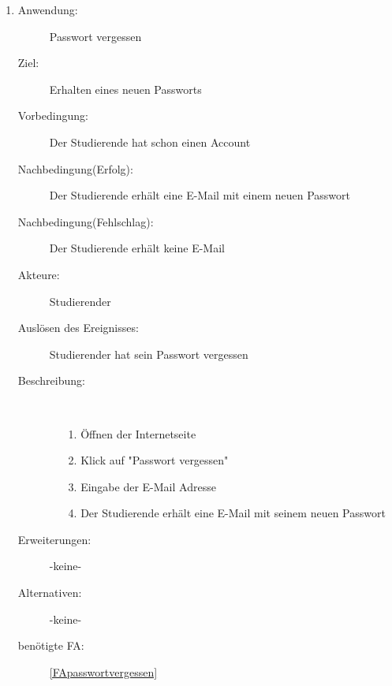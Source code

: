 \documentclass[parskip=full]{scrartcl}
\newcommand{\swtLabel}[1]{\textbf{/#1\arabic*0/}}
\begin{document}
\begin{enumerate}[label=\swtLabel{S}]
  
  \item
    \begin{description}
  	\item[Anwendung:] Passwort vergessen
  	\item[Ziel:] Erhalten eines neuen Passworts
  	\item[Vorbedingung:] Der Studierende hat schon einen Account
  	\item[Nachbedingung(Erfolg):] Der Studierende erhält eine E-Mail mit einem
  	neuen Passwort
  	\item[Nachbedingung(Fehlschlag):] Der Studierende erhält keine E-Mail
  	\item[Akteure:] Studierender
  	\item[Auslösen des Ereignisses:] Studierender hat sein Passwort vergessen
  	\item[Beschreibung:]~
  	\begin{enumerate}
  	  \item[1.] Öffnen der Internetseite
      \item[2.] Klick auf "Passwort vergessen"
      \item[3.] Eingabe der E-Mail Adresse
      \item[4.] Der Studierende erhält eine E-Mail mit seinem neuen Passwort
  	\end{enumerate}
  	\item[Erweiterungen:] -keine-
  	\item[Alternativen:] -keine-
  	\item[benötigte FA:] \ref{FApasswortvergessen}
  \end{description}
   
\end{enumerate}
\end{document}
